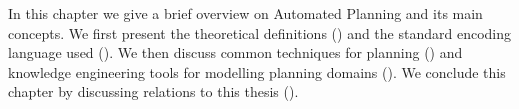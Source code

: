In this chapter we give a brief overview on Automated Planning and its main concepts.
We first present the theoretical definitions () and the standard encoding language used ().
We then discuss common techniques for planning () and knowledge engineering tools for modelling planning domains ().
We conclude this chapter by discussing relations to this thesis ().


%
%